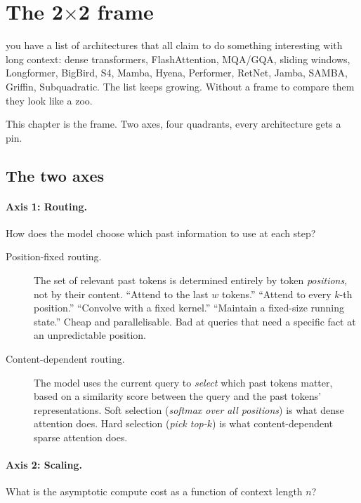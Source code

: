 \section{The 2$\times$2 frame}
\label{ch:quadrant}

 you have a list of architectures
that all claim to do something interesting with long context: dense
transformers, FlashAttention, MQA/GQA, sliding windows, Longformer,
BigBird, S4, Mamba, Hyena, Performer, RetNet, Jamba, SAMBA, Griffin,
Subquadratic. The list keeps growing. Without a frame to compare them
they look like a zoo.

This chapter is the frame. Two axes, four quadrants, every architecture
gets a pin.

\subsection{The two axes}

\paragraph{Axis 1: Routing.} How does the model choose which past
information to use at each step?

\begin{description}
\item[Position-fixed routing.] The set of relevant past tokens is
determined entirely by token \emph{positions}, not by their content.
``Attend to the last \(w\) tokens.'' ``Attend to every \(k\)-th
position.'' ``Convolve with a fixed kernel.'' ``Maintain a fixed-size
running state.'' Cheap and parallelisable. Bad at queries that need a
specific fact at an unpredictable position.
\item[Content-dependent routing.] The model uses the current query to
\emph{select} which past tokens matter, based on a similarity score
between the query and the past tokens' representations. Soft selection
(\emph{softmax over all positions}) is what dense attention does. Hard
selection (\emph{pick top-\(k\)}) is what content-dependent sparse
attention does.
\end{description}

\paragraph{Axis 2: Scaling.} What is the asymptotic compute cost as a
function of context length \(n\)?

